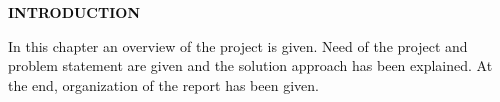 \documentclass[12pt]{report}
\renewcommand{\_}{\kern-1.5pt\textunderscore\kern-1.5pt}
\begin{document}
\vspace{\baselineskip}

\vspace{\baselineskip}
\vspace{\baselineskip}

\vspace{\baselineskip}

\vspace{\baselineskip}
\begin{adjustwidth}{3.7in}{0.84in}
{\fontsize{24pt}{28.8pt}\selectfont \textbf{\textcolor[HTML]{0D0D0D}{INTRODUCTION}}\par}\end{adjustwidth}


\vspace{\baselineskip}

\vspace{\baselineskip}
\vspace{\baselineskip}

\vspace{\baselineskip}
\begin{adjustwidth}{0.2in}{0.84in}
\textcolor[HTML]{0D0D0D}{In this chapter an overview of the project is given. Need of the project and problem statement are given and the solution approach has been explained. At the end, organization of the report has been given.}\par

\end{adjustwidth}
\end{document}
